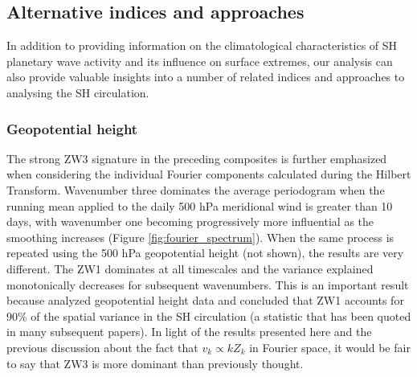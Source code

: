 \subsection{Alternative indices and approaches}

In addition to providing information on the climatological characteristics of SH planetary wave activity and its influence on surface extremes, our analysis can also provide valuable insights into a number of related indices and approaches to analysing the SH circulation.

\subsubsection{Geopotential height}\label{s:geopotential_height}

The strong ZW3 signature in the preceding composites is further emphasized when considering the individual Fourier components calculated during the Hilbert Transform. Wavenumber three dominates the average periodogram when the running mean applied to the daily 500 hPa meridional wind is greater than 10 days, with wavenumber one becoming progressively more influential as the smoothing increases (Figure \ref{fig:fourier_spectrum}). When the same process is repeated using the 500 hPa geopotential height (not shown), the results are very different. The ZW1 dominates at all timescales and the variance explained monotonically decreases for subsequent wavenumbers. This is an important result because \citet{vanLoon1972} analyzed geopotential height data and concluded that ZW1 accounts for 90\% of the spatial variance in the SH circulation (a statistic that has been quoted in many subsequent papers). In light of the results presented here and the previous discussion about the fact that $v_k \propto k Z_k$ in Fourier space, it would be fair to say that ZW3 is more dominant than previously thought. 